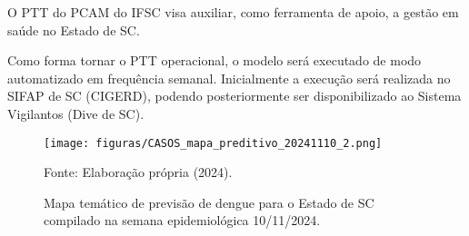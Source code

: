 \indent O \acrshort{PTT} do \acrlong{PCAM} do \acrshort{IFSC} visa auxiliar, como ferramenta de apoio, a gestão em saúde no Estado de \acrlong{SC}.

\indent Como forma tornar o \acrshort{PTT} operacional, o modelo será executado de modo automatizado em frequência semanal. Inicialmente a execução será realizada no \acrfull{SIFAP} de \acrlong{SC} (\acrfull{CIGERD}), podendo posteriormente ser disponibilizado ao Sistema Vigilantos (\acrlong{Dive} de \acrlong{SC}).

\begin{figure}[htbp]
    \begin{center}
    \caption{Mapa temático de previsão de dengue para o Estado de \acrlong{SC} compilado na semana epidemiológica 10/11/2024.}
    \label{fig:previsaoDengueProduto}
    \texttt{[image: figuras/CASOS\_mapa\_preditivo\_20241110\_2.png]}
    \end{center}
    \small{Fonte: Elaboração própria (2024).}
\end{figure}





